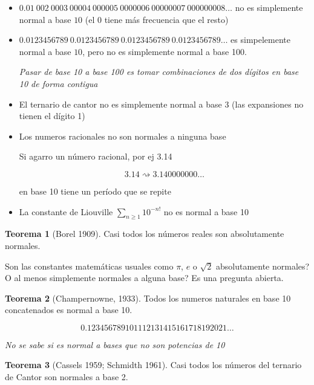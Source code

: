 \documentclass{report}
\theoremstyle{definition} %
\newtheorem{theorem}{Teorema}
\begin{document}
\begin{itemize}
    \item $0.01 \ 002 \ 0003 \ 00004 \ 000005 \ 0000006 \ 00000007 \ 000000008 \dots$
    no es simplemente normal a base $10$ (el 0 tiene más frecuencia que el
    resto)
    \item $0.0123456789 \ 0.0123456789 \ 0.0123456789 \ 0.0123456789 \dots$ es
    simpelemente normal a base $10$, pero no es simplemente normal a base 100.

    \textit{Pasar de base 10 a base 100 es tomar combinaciones de dos dígitos en base 10 de forma contigua}

    \item El ternario de cantor no es simplemente normal a base 3 (las
    expansiones no tienen el dígito 1)

    \item Los numeros racionales no son normales a ninguna base
    
    Si agarro un número racional, por ej 3.14

    $$3.14 \rightsquigarrow 3.140000000\dots$$
    
    en base 10 tiene un período que se repite

    \item La constante de Liouville $\sum_{n \geq 1} 10^{-n!}$ no es normal a
    base 10
\end{itemize}

\begin{theorem}[Borel 1909]
    Casi todos los números reales son absolutamente normales.
\end{theorem}

Son las constantes matemáticas usuales como $\pi$, $e$ o $\sqrt{2}$
absolutamente normales? O al menos simplemente normales a alguna base? Es una
pregunta abierta.

\begin{theorem}[Champernowne, 1933]

    Todos los numeros naturales en base 10 concatenados es normal a base 10.

    $$0.123456789101112131415161718192021\dots$$

    \textit{No se sabe si es normal a bases que no son potencias de 10}
    
\end{theorem}

\begin{theorem}[Cassels 1959; Schmidth 1961]
    Casi todos los números del ternario de Cantor son normales a base 2.
\end{theorem}
\end{document}
